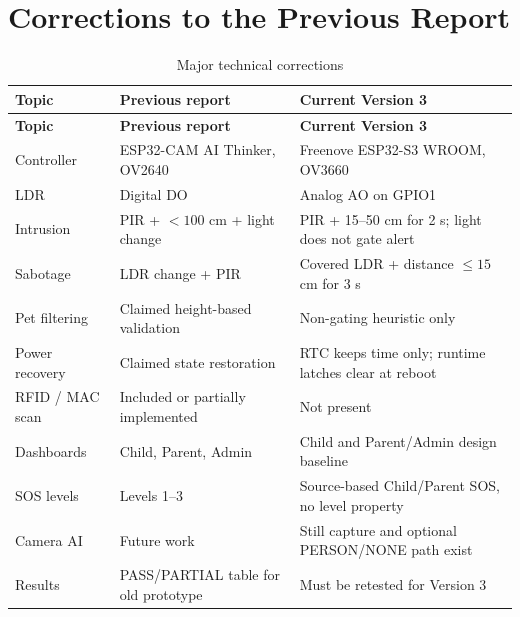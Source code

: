 \documentclass[11pt,a4paper]{report}
\begin{document}
\section{Corrections to the Previous Report}
\begin{longtable}{p{3.2cm}p{5.0cm}p{5.9cm}}
\caption{Major technical corrections}\\
\toprule
\textbf{Topic} & \textbf{Previous report} & \textbf{Current Version 3}\\
\midrule
\endfirsthead
\toprule
\textbf{Topic} & \textbf{Previous report} & \textbf{Current Version 3}\\
\midrule
\endhead
Controller & ESP32-CAM AI Thinker, OV2640 & Freenove ESP32-S3 WROOM, OV3660\\
LDR & Digital DO & Analog AO on GPIO1\\
Intrusion & PIR + $<100$ cm + light change & PIR + 15--50 cm for 2 s;
light does not gate alert\\
Sabotage & LDR change + PIR & Covered LDR + distance $\leq15$ cm for 3 s\\
Pet filtering & Claimed height-based validation & Non-gating heuristic only\\
Power recovery & Claimed state restoration & RTC keeps time only; runtime
latches clear at reboot\\
RFID / MAC scan & Included or partially implemented & Not present\\
Dashboards & Child, Parent, Admin & Child and Parent/Admin design baseline\\
SOS levels & Levels 1--3 & Source-based Child/Parent SOS, no level property\\
Camera AI & Future work & Still capture and optional PERSON/NONE path exist\\
Results & PASS/PARTIAL table for old prototype & Must be retested for Version 3\\
\bottomrule
\end{longtable}
\end{document}
